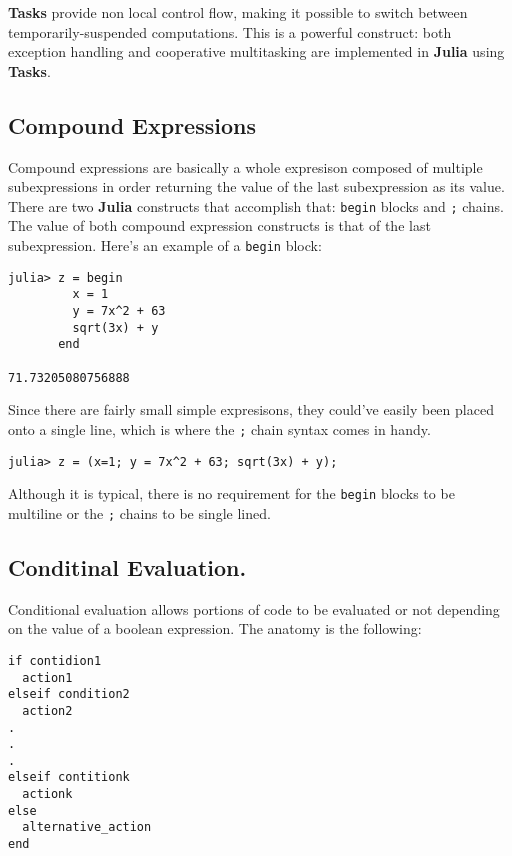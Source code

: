 \documentclass[
]{article}
\begin{document}
\textbf{Tasks} provide non local control flow, making it possible to
switch between temporarily-suspended computations. This is a powerful
construct: both exception handling and cooperative multitasking are
implemented in \textbf{Julia} using \textbf{Tasks}.

\hypertarget{compound-expressions}{%
\subsection{\texorpdfstring{\textbf{Compound
Expressions}}{Compound Expressions}}\label{compound-expressions}}

Compound expressions are basically a whole expresison composed of
multiple subexpressions in order returning the value of the last
subexpression as its value. There are two \textbf{Julia} constructs that
accomplish that: \texttt{begin} blocks and \texttt{;} chains. The value
of both compound expression constructs is that of the last
subexpression. Here's an example of a \texttt{begin} block:

\begin{verbatim}
julia> z = begin
         x = 1
         y = 7x^2 + 63
         sqrt(3x) + y
       end

71.73205080756888
\end{verbatim}

Since there are fairly small simple expresisons, they could've easily
been placed onto a single line, which is where the \texttt{;} chain
syntax comes in handy.

\begin{verbatim}
julia> z = (x=1; y = 7x^2 + 63; sqrt(3x) + y);
\end{verbatim}

Although it is typical, there is no requirement for the \texttt{begin}
blocks to be multiline or the \texttt{;} chains to be single lined.

\hypertarget{conditinal-evaluation.}{%
\subsection{\texorpdfstring{\textbf{Conditinal
Evaluation}.}{Conditinal Evaluation.}}\label{conditinal-evaluation.}}

Conditional evaluation allows portions of code to be evaluated or not
depending on the value of a boolean expression. The anatomy is the
following:

\begin{verbatim}
if contidion1
  action1
elseif condition2
  action2
.
.
.
elseif contitionk
  actionk
else
  alternative_action
end
\end{verbatim}
\end{document}
